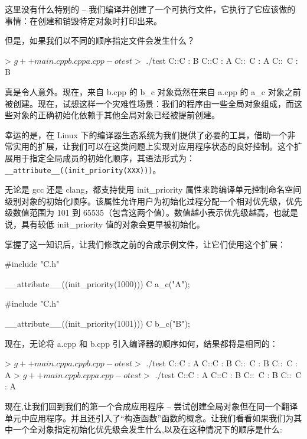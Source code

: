 这里没有什么特别的 – 我们编译并创建了一个可执行文件，它执行了它应该做的事情：在创建和销毁特定对象时打印出来。

但是，如果我们以不同的顺序指定文件会发生什么？

\begin{shell}
> $ g++ main.cpp b.cpp a.cpp -o test
> $ ./test
C::C : B
C::C : A
C::~C : A
C::~C : B
\end{shell}

真是令人意外。现在，来自 b.cpp 的 b\_c 对象竟然在来自 a.cpp 的 a\_c 对象之前被创建。现在，试想这样一个灾难性场景：我们的程序由一些全局对象组成，而这些对象的正确初始化依赖于其他全局对象已经被提前创建。

幸运的是，在 Linux 下的编译器生态系统为我们提供了必要的工具，借助一个非常实用的扩展，让我们可以在这类问题上实现对应用程序状态的良好控制。这个扩展用于指定全局成员的初始化顺序，其语法形式为：\verb|__attribute__((init_priority(XXX)))|。

无论是 gcc 还是 clang，都支持使用 init\_priority 属性来跨编译单元控制命名空间级别对象的初始化顺序。该属性允许用户为初始化过程分配一个相对优先级，优先级数值范围为 101 到 65535（包含这两个值）。数值越小表示优先级越高，也就是说，具有较低 init\_priority 值的对象会更早被初始化。

掌握了这一知识后，让我们修改之前的合成示例文件，让它们使用这个扩展：


\begin{cpp}
#include "C.h"

__attribute__((init_priority(1000))) C a_c("A");
\end{cpp}


\begin{cpp}
#include "C.h"

__attribute__((init_priority(1001))) C b_c("B");
\end{cpp}

现在，无论将 a.cpp 和 b.cpp 引入编译器的顺序如何，结果都将是相同的：

\begin{shell}
> $ g++ main.cpp a.cpp b.cpp -o test
> $ ./test
C::C : A
C::C : B
C::~C : B
C::~C : A
> $ g++ main.cpp b.cpp a.cpp -o test
> $ ./test
C::C : A
C::C : B
C::~C : B
C::~C : A
\end{shell}

现在,让我们回到我们的第一个合成应用程序 – 尝试创建全局对象但在同一个翻译单元中应用程序。并且还引入了“构造函数”函数的概念。让我们看看如果我们为其中一个全对象指定初始化优先级会发生什么,以及在这种情况下的顺序是什么:

